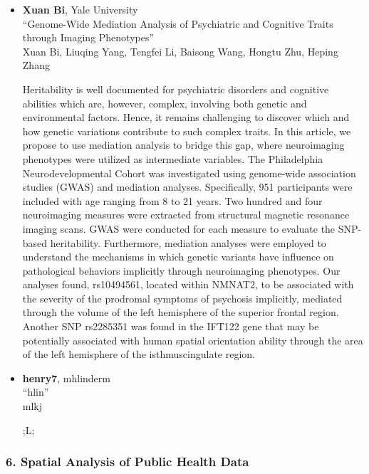 \begin{itemize}
\item \textbf{Xuan Bi}, Yale University \\
``Genome-Wide Mediation Analysis of Psychiatric and Cognitive Traits through Imaging Phenotypes'' \\
Xuan Bi, Liuqing Yang, Tengfei Li, Baisong Wang, Hongtu Zhu, Heping Zhang


Heritability is well documented for psychiatric disorders and cognitive abilities which are, however, complex, involving both genetic and environmental factors. Hence, it remains challenging to discover which and how genetic variations contribute to such complex traits. In this article, we propose to use mediation analysis to bridge this gap, where neuroimaging phenotypes were utilized as intermediate variables. The Philadelphia Neurodevelopmental Cohort was investigated using genome-wide association studies (GWAS) and mediation analyses. Specifically, 951 participants were included with age ranging from 8 to 21 years. Two hundred and four neuroimaging measures were extracted from structural magnetic resonance imaging scans. GWAS were conducted for each measure to evaluate the SNP-based heritability. Furthermore, mediation analyses were employed to understand the mechanisms in which genetic variants have influence on pathological behaviors implicitly through neuroimaging phenotypes. Our analyses found, rs10494561, located within NMNAT2, to be associated with the severity of the prodromal symptoms of psychosis implicitly, mediated through the volume of the left hemisphere of the superior frontal region. Another SNP rs2285351 was found in the IFT122 gene that may be potentially associated with human spatial orientation ability through the area of the left hemisphere of the isthmuscingulate region.

\item \textbf{henry7}, mhlinderm \\
``hlin'' \\
mlkj


;L;

\end{itemize}

\subsubsection*{6. Spatial Analysis of Public Health Data}

